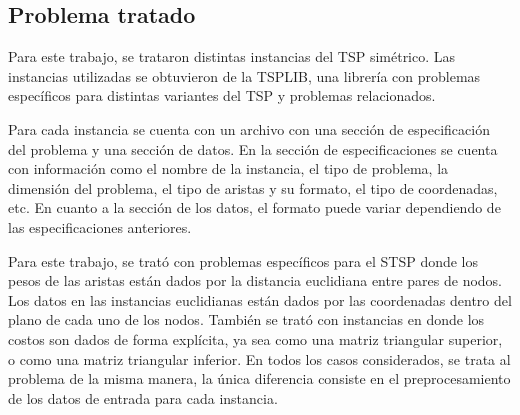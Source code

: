 \subsection*{Problema tratado}
Para este trabajo, se trataron distintas instancias del TSP simétrico. Las instancias utilizadas se obtuvieron de la TSPLIB, una librería con problemas específicos para distintas variantes del TSP y problemas relacionados.
\par Para cada instancia se cuenta con un archivo con una sección de especificación del problema y una sección de datos. En la sección de especificaciones se cuenta con información como el nombre de la instancia, el tipo de problema, la dimensión del problema, el tipo de aristas y su formato, el tipo de coordenadas, etc. En cuanto a la sección de los datos, el formato puede variar dependiendo de las especificaciones anteriores.
\par Para este trabajo, se trató con problemas específicos para el STSP donde los pesos de las aristas están dados por la distancia euclidiana entre pares de nodos. Los datos en las instancias euclidianas están dados por las coordenadas dentro del plano de cada uno de los nodos. También se trató con instancias en donde los costos son dados de forma explícita, ya sea como una matriz triangular superior, o como una matriz triangular inferior. En todos los casos considerados, se trata al problema de la misma manera, la única diferencia consiste en el preprocesamiento de los datos de entrada para cada instancia.

